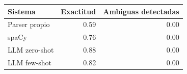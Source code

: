 \begin{tabular}{lrr}
\toprule
Sistema & Exactitud & Ambiguas detectadas \\
\midrule
Parser propio & 0.59 & 0.00 \\
spaCy & 0.76 & 0.00 \\
LLM zero-shot & 0.88 & 0.00 \\
LLM few-shot & 0.82 & 0.00 \\
\bottomrule
\end{tabular}

